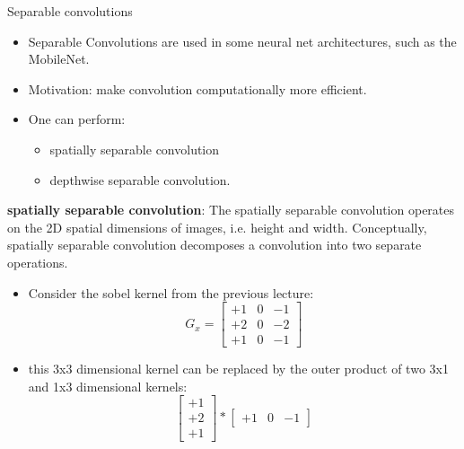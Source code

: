  \begin{vbframe}{Separable convolutions}
     \begin{itemize}
         \item Separable Convolutions are used in some neural net architectures, such as the MobileNet.
         \item Motivation: make convolution computationally more efficient.
         \item One can perform:
               \begin{itemize}
                   \item spatially separable convolution 
                   \item depthwise separable convolution.
                \end{itemize}
      \end{itemize}
      \textbf{spatially separable convolution}: The spatially separable convolution operates on the 2D spatial dimensions of images, i.e. height and width. Conceptually, spatially separable convolution decomposes a convolution into two separate operations.
      \begin{itemize}   
         \item Consider the sobel kernel from the previous lecture:
             \begin{equation*}
                     G_x = 
                     \begin{bmatrix}
                         +1 & 0 & -1 \\
                         +2 & 0 & -2 \\
                         +1 & 0 & -1 
                     \end{bmatrix}
             \end{equation*}
         \item this 3x3 dimensional kernel can be replaced by the outer product of two 3x1 and 1x3 dimensional kernels:
            \begin{equation*}
                     \begin{bmatrix}
                         +1 \\ 
                         +2 \\
                         +1   
                     \end{bmatrix}* 
                     \begin{bmatrix}
                         +1 & 0 & -1   
                     \end{bmatrix}
             \end{equation*}

\end{itemize}
\end{vbframe}

